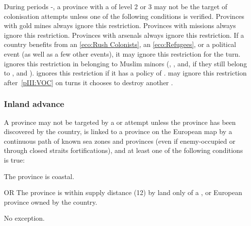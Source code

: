 \aparag During periods -, a province with a \COL of level
2 or 3 may not be the target of colonisation attempts unless one of the
following conditions is verified.
\bparag Provinces with gold mines always ignore this restriction.
\bparag Provinces with missions always ignore this restriction.
\bparag Provinces with arsenals always ignore this restriction.
\bparag If a country benefits from an \ref{eco:Rush Colonists}, an
\ref{eco:Refugees}, or a  political event (as well as
a few other events), it may ignore this restriction for the turn.
\bparag \TUR ignores this restriction in \Area belonging to Muslim minors
(\granderegionAden, \granderegionOman, \granderegionSoudan and, if they still
belong to \paysGujerat, \granderegionGujarat and \granderegionMalacca).
\bparag \SUE ignores this restriction if it has a policy of .
\bparag \HOL may ignore this restriction after~\ref{pIII:VOC} on turns it
chooses to destroy another \COL.


\subsubsection{Inland advance}\label{chAdministration:Inland advance}
\aparag[Settlements] A province may not be targeted by a \COL or \TP attempt
unless the province has been discovered by the country, is linked to a
province on the European map by a continuous path of known sea zones and
provinces (even if enemy-occupied or through closed straits fortifications),
and at least one of the following conditions is true:
\begin{modlist}
\item The province is coastal.
\item[OR] The province is within supply distance (12\MP) by land only of a
  \COL, \TP or European province owned by the country.
\end{modlist}
\bparag No exception.

